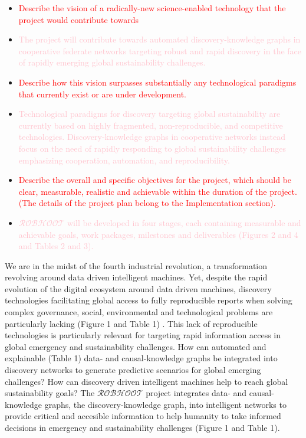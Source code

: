 \documentclass[11pt, a4paper]{article} %
\begin{document}
\begin{itemize}
\item \textcolor{red}{Describe the vision of a radically-new
    science-enabled technology that the project would contribute
    towards}
\item \textcolor{pink}{The project will contribute towards automated
    discovery-knowledge graphs in cooperative federate networks
    targeting robust and rapid discovery in the face of rapidly
    emerging global sustainability challenges.}
\item \textcolor{red}{Describe how this vision surpasses substantially
    any technological paradigms that currently exist or are under
    development.}
\item \textcolor{pink}{Technological paradigms for discovery targeting
    global sustainability are currently based on highly fragmented,
    non-reproducible, and competitive
    technologies. Discovery-knowledge graphs in cooperative networks
    instead focus on the need of rapidly responding to global
    sustainability challenges emphasizing cooperation, automation, and
    reproducibility.}
\item \textcolor{red}{Describe the overall and specific objectives for
    the project, which should be clear, measurable, realistic and
    achievable within the duration of the project. (The details of the
    project plan belong to the Implementation section).}
\item \textcolor{pink}{$\mathcal{ROBHOOT}$ will be developed in four
    stages, each containing measurable and achievable goals, work
    packages, milestones and deliverables (Figures 2 and 4 and Tables
    2 and 3).}
\end{itemize}

We are in the midst of the fourth industrial revolution, a
transformation revolving around data driven intelligent machines. Yet,
despite the rapid evolution of the digital ecosystem around data
driven machines, discovery technologies facilitating global access to
fully reproducible reports when solving complex governance, social,
environmental and technological problems are particularly lacking
(Figure 1 and Table 1) \citep{Mastrangelo2019}. This lack of
reproducible technologies is particularly relevant for targeting rapid
information access in global emergency and sustainability
challenges. How can automated and explainable (Table 1) data- and
causal-knowledge graphs be integrated into discovery networks to
generate predictive scenarios for global emerging challenges? How can
discovery driven intelligent machines help to reach global
sustainability goals? The $\mathcal{ROBHOOT}$ project integrates data-
and causal-knowledge graphs, the discovery-knowledge graph, into
intelligent networks to provide critical and accesible information to
help humanity to take informed decisions in emergency and
sustainability challenges (Figure 1 and Table 1).
\end{document}
